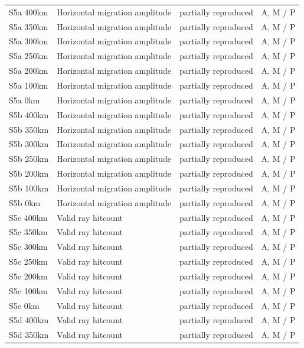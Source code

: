 \documentclass[10pt]{article}
\begin{document}
\begin{longtable}{p{.23\linewidth}p{.25\linewidth}p{.19\linewidth}p{.22\linewidth}}
S5a 400km & Horizontal migration amplitude & partially reproduced & A, M / P \\
S5a 350km & Horizontal migration amplitude & partially reproduced & A, M / P \\
S5a 300km & Horizontal migration amplitude & partially reproduced & A, M / P \\
S5a 250km & Horizontal migration amplitude & partially reproduced & A, M / P \\
S5a 200km & Horizontal migration amplitude & partially reproduced & A, M / P \\
S5a 100km & Horizontal migration amplitude & partially reproduced & A, M / P \\
S5a 0km & Horizontal migration amplitude & partially reproduced & A, M / P \\
S5b 400km & Horizontal migration amplitude & partially reproduced & A, M / P \\
S5b 350km & Horizontal migration amplitude & partially reproduced & A, M / P \\
S5b 300km & Horizontal migration amplitude & partially reproduced & A, M / P \\
S5b 250km & Horizontal migration amplitude & partially reproduced & A, M / P \\
S5b 200km & Horizontal migration amplitude & partially reproduced & A, M / P \\
S5b 100km & Horizontal migration amplitude & partially reproduced & A, M / P \\
S5b 0km & Horizontal migration amplitude & partially reproduced & A, M / P \\
S5c 400km & Valid ray hitcount & partially reproduced & A, M / P \\
S5c 350km & Valid ray hitcount & partially reproduced & A, M / P \\
S5c 300km & Valid ray hitcount & partially reproduced & A, M / P \\
S5c 250km & Valid ray hitcount & partially reproduced & A, M / P \\
S5c 200km & Valid ray hitcount & partially reproduced & A, M / P \\
S5c 100km & Valid ray hitcount & partially reproduced & A, M / P \\
S5c 0km & Valid ray hitcount & partially reproduced & A, M / P \\
S5d 400km & Valid ray hitcount & partially reproduced & A, M / P \\
S5d 350km & Valid ray hitcount & partially reproduced & A, M / P \\

\end{longtable}
\end{document}
